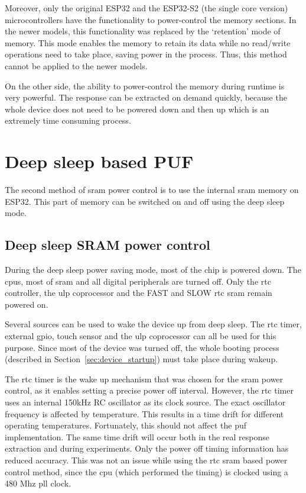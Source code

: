 Moreover, only the original ESP32 and the ESP32-S2 (the single core version) microcontrollers have the functionality to power-control the memory sections. In the newer models, this functionality was replaced by the `retention' mode of memory. This mode enables the memory to retain its data while no read/write operations need to take place, saving power in the process.\cite{esp322021} Thus, this method cannot be applied to the newer models.

On the other side, the ability to power-control the memory during runtime is very powerful. The response can be extracted on demand quickly, because the whole device does not need to be powered down and then up which is an extremely time consuming process.

\section{Deep sleep based PUF}

The second method of \gls{sram} power control is to use the internal \gls{sram} memory on ESP32. This part of memory can be switched on and off using the deep sleep mode.

\subsection{Deep sleep SRAM power control}

During the deep sleep power saving mode, most of the chip is powered down. The \glspl{cpu}, most of \gls{sram} and all digital peripherals are turned off. Only the \gls{rtc} controller, the \gls{ulp} coprocessor and the FAST and SLOW \gls{rtc} \gls{sram} remain powered on. 

Several sources can be used to wake the device up from deep sleep. The \gls{rtc} timer, external \gls{gpio}, touch sensor and the \gls{ulp} coprocessor can all be used for this purpose. Since most of the device was turned off, the whole booting process (described in Section~\ref{sec:device_startup}) must take place during wakeup.

The \gls{rtc} timer is the wake up mechanism that was chosen for the \gls{sram} power control, as it enables setting a precise power off interval. However, the \gls{rtc} timer uses an internal 150kHz RC oscillator as its clock source. The exact oscillator frequency is affected by temperature. This results in a time drift for different operating temperatures. Fortunately, this should not affect the \gls{puf} implementation. The same time drift will occur both in the real response extraction and during experiments. Only the power off timing information has reduced accuracy. This was not an issue while using the \gls{rtc} \gls{sram} based power control method, since the \gls{cpu} (which performed the timing) is clocked using  a 480 Mhz \gls{pll} clock.\cite{esp322021}\cite{espidf2022}

